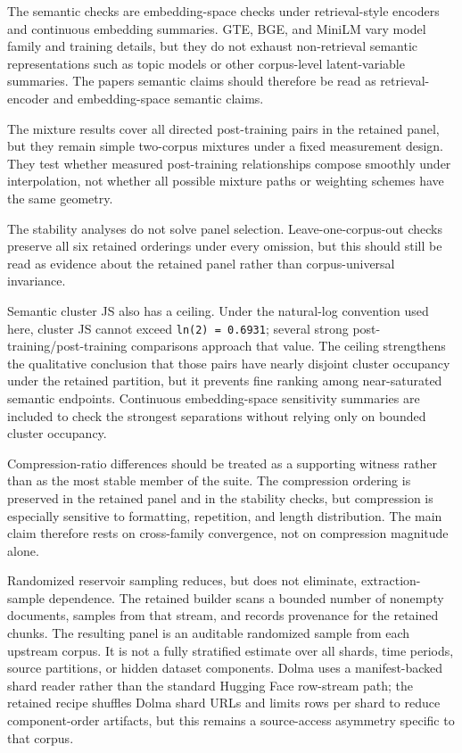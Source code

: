 \documentclass[11pt]{article}
\begin{document}
The semantic checks are embedding-space checks under retrieval-style encoders and continuous embedding summaries. GTE, BGE, and MiniLM vary model family and training details, but they do not exhaust non-retrieval semantic representations such as topic models or other corpus-level latent-variable summaries. The paper\textquotesingle s semantic claims should therefore be read as retrieval-encoder and embedding-space semantic claims.

The mixture results cover all directed post-training pairs in the retained panel, but they remain simple two-corpus mixtures under a fixed measurement design. They test whether measured post-training relationships compose smoothly under interpolation, not whether all possible mixture paths or weighting schemes have the same geometry.

The stability analyses do not solve panel selection. Leave-one-corpus-out checks preserve all six retained orderings under every omission, but this should still be read as evidence about the retained panel rather than corpus-universal invariance.

Semantic cluster JS also has a ceiling. Under the natural-log convention used here, cluster JS cannot exceed \texttt{ln(2)\ =\ 0.6931}; several strong post-training/post-training comparisons approach that value. The ceiling strengthens the qualitative conclusion that those pairs have nearly disjoint cluster occupancy under the retained partition, but it prevents fine ranking among near-saturated semantic endpoints. Continuous embedding-space sensitivity summaries are included to check the strongest separations without relying only on bounded cluster occupancy.

Compression-ratio differences should be treated as a supporting witness rather than as the most stable member of the suite. The compression ordering is preserved in the retained panel and in the stability checks, but compression is especially sensitive to formatting, repetition, and length distribution. The main claim therefore rests on cross-family convergence, not on compression magnitude alone.

Randomized reservoir sampling reduces, but does not eliminate, extraction-sample dependence. The retained builder scans a bounded number of nonempty documents, samples from that stream, and records provenance for the retained chunks. The resulting panel is an auditable randomized sample from each upstream corpus. It is not a fully stratified estimate over all shards, time periods, source partitions, or hidden dataset components. Dolma uses a manifest-backed shard reader rather than the standard Hugging Face row-stream path; the retained recipe shuffles Dolma shard URLs and limits rows per shard to reduce component-order artifacts, but this remains a source-access asymmetry specific to that corpus.
\end{document}
